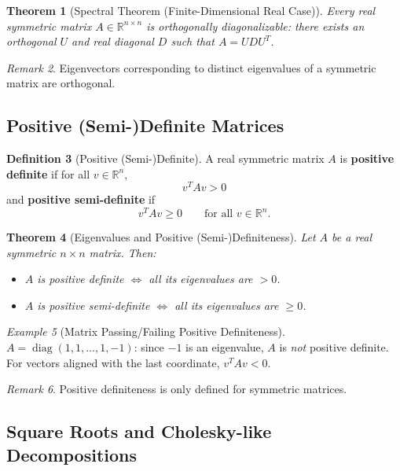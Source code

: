 \documentclass[12pt]{article}
\theoremstyle{definition}
\newtheorem{definition}{Definition}[section]
\theoremstyle{plain}
\newtheorem{theorem}[definition]{Theorem}
\theoremstyle{remark}
\newtheorem{example}[definition]{Example}
\newtheorem{remark}[definition]{Remark}
\begin{document}
\begin{theorem}[Spectral Theorem (Finite-Dimensional Real Case)]
    Every real symmetric matrix $A \in \mathbb{R}^{n \times n}$ is orthogonally diagonalizable: there exists an orthogonal $U$ and real diagonal $D$ such that $A = U D U^T$.
\end{theorem}

\begin{remark}
    Eigenvectors corresponding to distinct eigenvalues of a symmetric matrix are orthogonal.
\end{remark}

\subsection{Positive (Semi-)Definite Matrices}

\begin{definition}[Positive (Semi-)Definite]
    A real symmetric matrix $A$ is \textbf{positive definite} if for all $v \in \mathbb{R}^n$,
    \[
        v^T A v > 0
    \]
    and \textbf{positive semi-definite} if
    \[
        v^T A v \geq 0 \qquad \text{for all } v \in \mathbb{R}^n.
    \]
\end{definition}

\begin{theorem}[Eigenvalues and Positive (Semi-)Definiteness]
    Let $A$ be a real symmetric $n \times n$ matrix. Then:
    \begin{itemize}
        \item $A$ is positive definite $\iff$ all its eigenvalues are $> 0$.
        \item $A$ is positive semi-definite $\iff$ all its eigenvalues are $\geq 0$.
    \end{itemize}
\end{theorem}

\begin{example}[Matrix Passing/Failing Positive Definiteness]
    $A = \operatorname{diag}(1,1,\dots,1,-1)$: since $-1$ is an eigenvalue, $A$ is \emph{not} positive definite. For vectors aligned with the last coordinate, $v^T A v < 0$.
\end{example}

\begin{remark}
    Positive definiteness is only defined for symmetric matrices.
\end{remark}

\subsection{Square Roots and Cholesky-like Decompositions}
\end{document}
